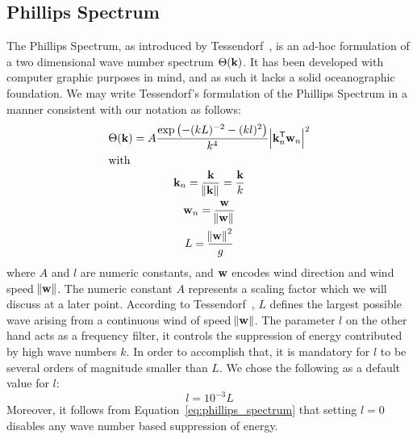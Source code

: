 \subsection{Phillips Spectrum}
\label{sec:phillips_spectrum}
%
The Phillips Spectrum, as introduced by Tessendorf~\cite{course:simulatingocean}, is an ad-hoc formulation of a two dimensional wave number spectrum $\Theta(\mathbf{k})$. It has been developed with computer graphic purposes in mind, and as such it lacks a solid oceanographic foundation. We may write Tessendorf's formulation of the Phillips Spectrum in a manner consistent with our notation as follows:
%
\begin{subequations}
\begin{gather}
\label{eq:phillips_spectrum}
 \Theta(\mathbf{k}) = A\frac{\exp\left(-(kL)^{-2}-(kl)^2\right)}{k^4}\abs{\mathbf{k}_n^{\mathsf{T}}\mathbf{w}_n}^2\\
\intertext{with}
\mathbf{k}_n = \frac{\mathbf{k}}{\norm{\mathbf{k}}} = \frac{\mathbf{k}}{k}\\
\mathbf{w}_n = \frac{\mathbf{w}}{\norm{\mathbf{w}}}\\
L = \frac{\norm{\mathbf{w}}^2}{g}
\end{gather}
\end{subequations}
%
where $A$ and $l$ are numeric constants, and $\mathbf{w}$ encodes wind 
direction and wind speed $\norm{\mathbf{w}}$. The numeric constant $A$ represents 
a scaling factor which we will discuss at a later point.  According to 
Tessendorf~\cite{course:simulatingocean}, $L$ defines the largest possible wave
arising from a continuous wind of speed $\norm{\mathbf{w}}$. The parameter $l$ on 
the other hand acts as a frequency filter, it controls the suppression of energy
contributed by high wave numbers $k$. In order to accomplish that, it is
mandatory for $l$ to be several orders of magnitude smaller than $L$. We chose
the following as a default value for $l$:
\begin{equation}
 l = 10^{-3}L
\end{equation}
Moreover, it follows from Equation~\ref{eq:phillips_spectrum} that setting 
$l = 0$ disables any wave number based suppression of energy.\\

